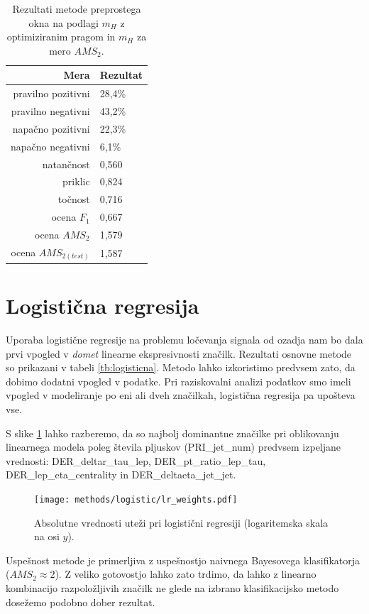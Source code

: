\documentclass[11pt,a4paper,openany]{book}
\begin{document}
\begin{table}[ht]
	\centering
	\begin{tabular}{rl}
		\hline
		\textbf{Mera} & \textbf{Rezultat} \\
		\hline
		pravilno pozitivni & 28,4\%\\
		pravilno negativni & 43,2\% \\
		napačno pozitivni & 22,3\% \\
		napačno negativni & 6,1\% \\
		natančnost & 0,560 \\
		priklic & 0,824 \\
		točnost & 0,716 \\
		ocena $F_1$ & 0,667 \\
		ocena $AMS_2$ & 1,579 \\
		ocena $AMS_{2(test)}$ & 1,587 		
	\end{tabular}
	\caption{Rezultati metode preprostega okna na podlagi $m_H$ z optimiziranim pragom in $m_H$ za mero $AMS_2$.}
	\label{tb:preprosto_okno_2d_optimized}
\end{table}

\section{Logistična regresija}
Uporaba logistične regresije na problemu ločevanja signala od ozadja nam bo dala prvi vpogled v \textit{domet} linearne ekspresivnosti značilk. Rezultati osnovne metode so prikazani v tabeli \ref{tb:logisticna}. Metodo lahko izkoristimo predvsem zato, da dobimo dodatni vpogled v podatke. Pri raziskovalni analizi podatkov smo imeli vpogled v modeliranje po eni ali dveh značilkah, logistična regresija pa upošteva vse. 

S slike \ref{sl:logistic_weights} lahko razberemo, da so najbolj dominantne značilke pri oblikovanju linearnega modela poleg števila pljuskov (PRI\_jet\_num) predvsem izpeljane vrednosti: DER\_deltar\_tau\_lep, DER\_pt\_ratio\_lep\_tau, DER\_lep\_eta\_centrality in DER\_deltaeta\_jet\_jet.

\begin{figure}[h]
	\centering	
	\texttt{[image: methods/logistic/lr\_weights.pdf]}
	
	\caption{Absolutne vrednosti uteži pri logistični regresiji (logaritemska skala na osi $y$).}
	\label{sl:logistic_weights}
\end{figure}

Uspešnost metode je primerljiva z uspešnostjo naivnega Bayesovega klasifikatorja ($AMS_2 \approx 2$). Z veliko gotovostjo lahko zato trdimo, da lahko z linearno kombinacijo razpoložljivih značilk ne glede na izbrano klasifikacijsko metodo dosežemo podobno dober rezultat.
\end{document}
